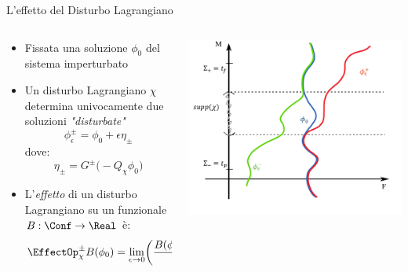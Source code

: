 \documentclass[8pt,handout]{beamer}
\begin{document}
		\begin{frame}{L'effetto del Disturbo Lagrangiano}
		  	\begin{columns}[T]
    			\begin{column}{.5\textwidth}
						\begin{itemize}
							\item Fissata una soluzione $\phi_0$ del sistema imperturbato 
							\item Un disturbo Lagrangiano $\chi$ determina univocamente due soluzioni \emph{"disturbate"}
								\begin{displaymath}
									\phi^\pm_\epsilon = \phi_0 + \epsilon \eta_\pm
								\end{displaymath}
								dove:
								 \begin{displaymath}
   									\eta_\pm = G^\pm \big( - Q_\chi \phi_0 \big)
   								\end{displaymath}
   						\item L'\emph{effetto} di un disturbo Lagrangiano su un funzionale $B:\Conf\rightarrow \Real$ è:
   							\begin{displaymath}		
								\EffectOp_\chi^\pm B ( \phi_0) 
								= \lim_{\epsilon \rightarrow 0}
								 \biggr( \frac{B(\phi_\epsilon^\pm) - B (\phi_0)}{\epsilon} \biggr)
   							\end{displaymath}			
						\end{itemize}
    			\end{column}
    		   	\begin{column}{.5\textwidth}
					\parbox[c][.7\textheight][c]{\columnwidth}{%
							\includegraphics[width=\textwidth]{Presentazione/AdvRetSol(pezzotta)}
					}
    			\end{column}
    		\end{columns}
	\end{frame}
\end{document}
